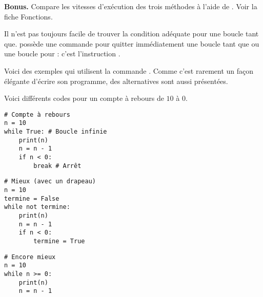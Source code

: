 \documentclass[11pt,class=report,crop=false]{standalone}
\begin{document}
\begin{activite}
\begin{enumerate}
\end{enumerate}  
  
  
\textbf{Bonus.} Compare les vitesses d'exécution des trois méthodes à l'aide de . Voir la fiche \og{}Fonctions\fg{}.

\end{activite}

\begin{cours}

Il n'est pas toujours facile de trouver la condition adéquate pour une boucle \og{}tant que\fg{}. \Python{} possède une commande pour quitter immédiatement une boucle \og{}tant que\fg{}
ou une boucle \og{}pour\fg{} : c'est l'instruction 
.

Voici des exemples qui utilisent la commande . Comme c'est rarement un façon élégante d'écrire son programme, des alternatives sont aussi présentées.

\begin{exemple}

Voici différents codes pour un compte à rebours de $10$ à $0$.

\begin{minipage}{0.3\textwidth}
\begin{lstlisting}
# Compte à rebours
n = 10
while True: # Boucle infinie
    print(n)
    n = n - 1
    if n < 0:
        break # Arrêt
\end{lstlisting}
\end{minipage}\qquad\qquad
\begin{minipage}{0.4\textwidth}
\begin{lstlisting}
# Mieux (avec un drapeau)
n = 10
termine = False
while not termine:
    print(n)
    n = n - 1   
    if n < 0:
        termine = True
\end{lstlisting}
\end{minipage}
\begin{minipage}{0.2\textwidth}
\begin{lstlisting}
# Encore mieux
n = 10
while n >= 0:
    print(n)
    n = n - 1
\end{lstlisting}
\end{minipage}
\end{exemple}

\begin{exemple}


\end{exemple}
\end{cours}
\end{document}
